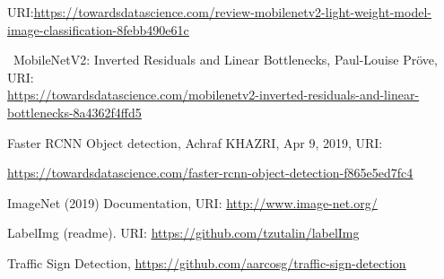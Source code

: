 \documentclass[12pt]{report}
\renewcommand{\_}{\kern-1.5pt\textunderscore\kern-1.5pt}
\begin{document}
\begin{justify}
URI:\href{https://towardsdatascience.com/review-mobilenetv2-light-weight-model-image-classification-8febb490e61c}{\textcolor[HTML]{1155CC}{\ul{https://towardsdatascience.com/review-mobilenetv2-light-weight-model-image-classification-8febb490e61c}}}
\end{justify}\par


\vspace{\baselineskip}
\begin{justify}
[4]\ MobileNetV2: Inverted Residuals and Linear Bottlenecks,  Paul-Louise Pröve, URI: \\
\href{https://towardsdatascience.com/mobilenetv2-inverted-residuals-and-linear-bottlenecks-8a4362f4ffd5}{\textcolor[HTML]{1155CC}{\ul{https://towardsdatascience.com/mobilenetv2-inverted-residuals-and-linear-bottlenecks-8a4362f4ffd5}}}
\end{justify}\par


\vspace{\baselineskip}
\begin{justify}
[5] Faster RCNN Object detection, Achraf KHAZRI, Apr 9, 2019, URI:
\end{justify}\par

\begin{justify}
 \href{https://towardsdatascience.com/faster-rcnn-object-detection-f865e5ed7fc4}{\textcolor[HTML]{1155CC}{\ul{https://towardsdatascience.com/faster-rcnn-object-detection-f865e5ed7fc4}}}
\end{justify}\par


\vspace{\baselineskip}
\begin{justify}
[6] ImageNet (2019) Documentation, URI: \href{http://www.image-net.org/}{\textcolor[HTML]{1155CC}{\ul{http://www.image-net.org/}}}
\end{justify}\par


\vspace{\baselineskip}
\begin{justify}
[7] LabelImg (readme). URI: \href{https://github.com/tzutalin/labelImg}{\textcolor[HTML]{1155CC}{\ul{https://github.com/tzutalin/labelImg}}}
\end{justify}\par


\vspace{\baselineskip}
\begin{justify}
[8] Traffic Sign Detection, \href{https://github.com/aarcosg/traffic-sign-detection}{\textcolor[HTML]{1155CC}{\ul{https://github.com/aarcosg/traffic-sign-detection}}}
\end{justify}\par
\end{document}
